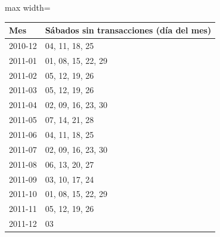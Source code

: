 \begin{center}\small\setlength{\tabcolsep}{4pt}
\begin{adjustbox}{max width=\textwidth}\begin{tabular}{ll}
\toprule
Mes & Sábados sin transacciones (día del mes) \\ \midrule
2010-12 & 04, 11, 18, 25 \\
2011-01 & 01, 08, 15, 22, 29 \\
2011-02 & 05, 12, 19, 26 \\
2011-03 & 05, 12, 19, 26 \\
2011-04 & 02, 09, 16, 23, 30 \\
2011-05 & 07, 14, 21, 28 \\
2011-06 & 04, 11, 18, 25 \\
2011-07 & 02, 09, 16, 23, 30 \\
2011-08 & 06, 13, 20, 27 \\
2011-09 & 03, 10, 17, 24 \\
2011-10 & 01, 08, 15, 22, 29 \\
2011-11 & 05, 12, 19, 26 \\
2011-12 & 03 \\
\bottomrule\end{tabular}\end{adjustbox}\end{center}
